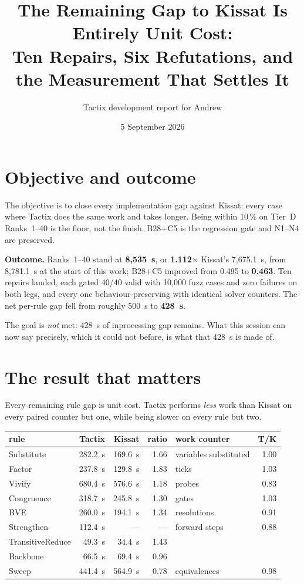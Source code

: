 \documentclass[11pt]{article}
\title{The Remaining Gap to Kissat Is Entirely Unit Cost:\\
Ten Repairs, Six Refutations, and the Measurement That Settles It}
\author{Tactix development report for Andrew}
\date{5 September 2026}
\begin{document}
\maketitle

\section{Objective and outcome}

The objective is to close every implementation gap against Kissat: every case
where Tactix does the same work and takes longer. Being within 10\,\% on
Tier~D Ranks~1--40 is the floor, not the finish. B28+C5 is the regression gate
and N1--N4 are preserved.

\textbf{Outcome.} Ranks~1--40 stand at \textbf{8{,}535~s}, or
\textbf{1.112$\times$} Kissat's 7{,}675.1~s, from 8{,}781.1~s at the start of
this work; B28+C5 improved from 0.495 to \textbf{0.463}. Ten repairs landed,
each gated 40/40 valid with 10{,}000 fuzz cases and zero failures on both
legs, and every one behaviour-preserving with identical solver counters. The
net per-rule gap fell from roughly 500~s to \textbf{428~s}.

The goal is \emph{not} met: 428~s of inprocessing gap remains. What this
session can now say precisely, which it could not before, is what that 428~s
is made of.

\section{The result that matters}

Every remaining rule gap is unit cost. Tactix performs \emph{less} work than
Kissat on every paired counter but one, while being slower on every rule but
two.

\begin{center}
\begin{tabular}{lrrrlr}
\toprule
rule & Tactix & Kissat & ratio & work counter & T/K \\
\midrule
Substitute       & 282.2~s & 169.6~s & 1.66 & variables substituted & 1.00 \\
Factor           & 237.8~s & 129.8~s & 1.83 & ticks                 & 1.03 \\
Vivify           & 680.4~s & 576.6~s & 1.18 & probes                & 0.83 \\
Congruence       & 318.7~s & 245.8~s & 1.30 & gates                 & 1.03 \\
BVE              & 260.0~s & 194.1~s & 1.34 & resolutions           & 0.91 \\
Strengthen       & 112.4~s & ---     & ---  & forward steps         & 0.88 \\
TransitiveReduce & 49.3~s  & 34.4~s  & 1.43 &                       &      \\
Backbone         & 66.5~s  & 69.4~s  & 0.96 &                       &      \\
Sweep            & 441.4~s & 564.9~s & 0.78 & equivalences          & 0.98 \\
\bottomrule
\end{tabular}
\end{center}
\end{document}

